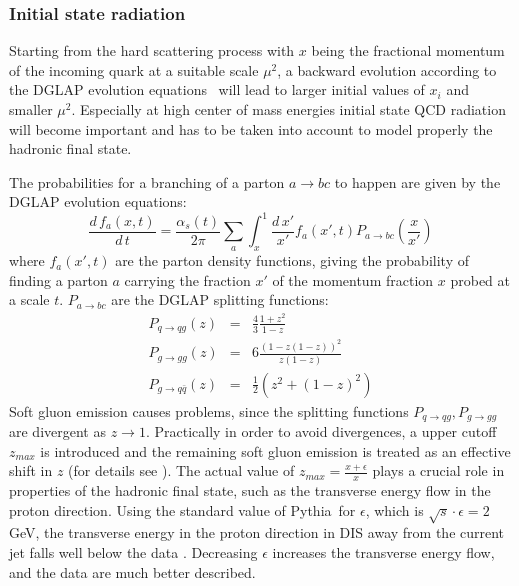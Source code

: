\documentclass[10pt]{article} \usepackage{dina4}
\def\PYTHIA{{\sc Pythia}}
\begin{document}
\subsubsection{Initial state radiation}
 Starting from the hard scattering process with
$x$ being the fractional momentum  of the incoming quark
 at a suitable scale $\mu ^2$,
 a backward evolution according to the DGLAP evolution
equations~\cite{DGLAPa,DGLAPb,DGLAPc,DGLAPd}
 will lead to larger initial values of 
$x_i$ and smaller $\mu ^2$.
Especially at high center of mass  energies 
initial state QCD radiation will
become important and has to be taken into account to model properly the
hadronic final state.
\par
The probabilities for a branching of a parton $a \to b c$
to happen are given by the DGLAP
evolution equations:
\begin{equation}
\frac{d\,f_a (x,t)}{d\,t} = \frac{\alpha_s (t)}{2 \pi}
        \sum_a \int_x ^1 \frac{d\,x'}{x'} f_a (x',t)
        P_{a \rightarrow b c} \left(\frac{x}{x'}\right)
\end{equation}
where $f_a (x',t)$ are the parton density functions, giving the
probability of finding a parton $a$ carrying the fraction $x'$ of the
momentum fraction $x$ probed at a  scale $t$. $P_{a \rightarrow b c} $
are the DGLAP splitting functions:
\begin{eqnarray}
  P_{q \rightarrow q g} (z) & = &\frac{4}{3} \frac{1 + z^2}{1-z} \\
  P_{g \rightarrow g g} (z) & = & 6 \frac{(1 - z(1-z))^2}{z(1-z)} \\
  P_{g \rightarrow q \bar{q}} (z) & = &\frac{1}{2}(z^2 +(1-z)^2) 
\end{eqnarray}
Soft gluon emission causes problems, since the splitting functions 
$P_{q \rightarrow q g},  P_{g \rightarrow g g}$ are divergent as
$z \rightarrow 1$. Practically 
in order to avoid divergences, a upper cutoff
$z_{max}$ is introduced and the remaining soft gluon emission is
treated as an effective shift in $z$ (for details
see \cite{PYTHIAPSa,PYTHIAPSb}). 
The actual value of $z_{max}=\frac{x+\epsilon}{x}$ plays a crucial role
in properties of the hadronic final state, such as the transverse 
energy flow in the proton direction. Using the standard value of \PYTHIA\ 
for $\epsilon$, which is $\sqrt{s} \cdot \epsilon = 2 $ GeV, the
transverse energy in the proton direction in DIS away from the current jet
falls well below the data \cite{H1_energyflow}. Decreasing $\epsilon$ 
increases the transverse energy flow, and the data are much better described.
\end{document}

